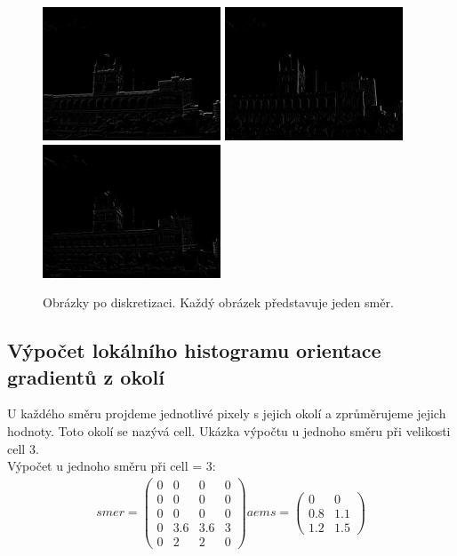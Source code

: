 \documentclass{report}
\begin{document}
\begin{figure}[H]
	\centering
	\includegraphics[width=150pt]{./img/directional0.jpg}
	\includegraphics[width=150pt]{./img/directional1.jpg}
	\includegraphics[width=150pt]{./img/directional2.jpg}
	\caption{Obrázky po diskretizaci. Každý obrázek představuje jeden směr.}
\end{figure}


\subsection{Výpočet lokálního histogramu orientace gradientů z okolí}
U každého směru projdeme jednotlivé pixely s jejich okolí a zprůměrujeme jejich hodnoty. Toto okolí se nazývá cell. Ukázka výpočtu u jednoho směru při velikosti cell 3. \\
 
Výpočet u jednoho směru při cell = 3:
\begin{align}
	\label{aems}
		smer = \begin{pmatrix}0 & 0 & 0 & 0 \\ 0 & 0 & 0 & 0 \\0 & 0 & 0 & 0 \\ 0 & 3.6 & 3.6 & 3 \\ 0 & 2 & 2 & 0 \end{pmatrix}
		aems = \begin{pmatrix}0 & 0 \\ 0.8 & 1.1 \\ 1.2 & 1.5 \end{pmatrix}
\end{align}
\end{document}
